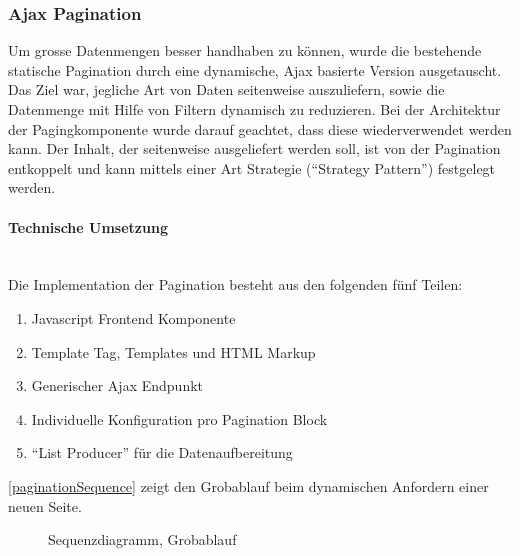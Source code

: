 \subsubsection{Ajax Pagination} 
Um grosse Datenmengen besser handhaben zu können, wurde die bestehende statische
Pagination durch eine dynamische, Ajax basierte Version ausgetauscht. Das Ziel
war, jegliche Art von Daten seitenweise auszuliefern, sowie die Datenmenge mit
Hilfe von Filtern dynamisch zu reduzieren. Bei der Architektur der
Pagingkomponente wurde darauf geachtet, dass diese wiederverwendet werden kann.
Der Inhalt, der seitenweise ausgeliefert werden soll, ist von der Pagination
entkoppelt und kann mittels einer Art Strategie (\enquote{Strategy Pattern}\cite{gamma1994design}) festgelegt werden.

\paragraph{Technische Umsetzung} \hspace{0pt} \\
Die Implementation der Pagination besteht aus den folgenden fünf Teilen:
\begin{enumerate}
	\item Javascript Frontend Komponente
	\item Template Tag, Templates und HTML Markup
	\item Generischer Ajax Endpunkt
	\item Individuelle Konfiguration pro Pagination Block
	\item \enquote{List Producer} für die Datenaufbereitung
\end{enumerate}

\autoref{paginationSequence} zeigt den Grobablauf beim dynamischen Anfordern einer
neuen Seite.

\begin{figure}[H]	
	\centering
	\resizebox{\textwidth}{!}{%
		
	}
	\caption{Sequenzdiagramm, Grobablauf}
	\label{paginationSequence}
\end{figure}



